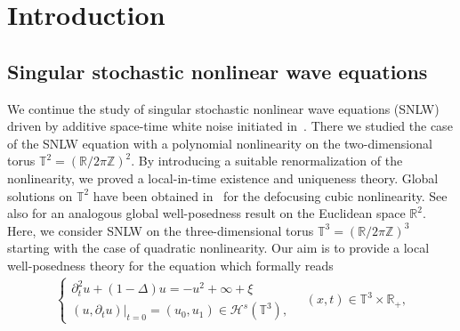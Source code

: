 \documentclass[%
11pt,  reqno]{amsart}
\newcommand{\1}{\hspace{0.2mm}\text{I}\hspace{0.2mm}}
\newcommand{\Z}{\mathbb{Z}}
\newcommand{\R}{\mathbb{R}}
\newcommand{\T}{\mathbb{T}}
\newcommand{\Dl}{\Delta}
\newcommand{\dt}{\partial_t}
\renewcommand{\H}{\mathcal{H}}
\numberwithin{equation}{section}
\numberwithin{theorem}{section}
\begin{document}
\begin{abstract}
Using  ideas from  paracontrolled calculus, 
we prove local well-posedness
of a renormalized version of the
 three-dimensional stochastic nonlinear wave equation 
with  quadratic nonlinearity forced by 
an additive space-time white noise on a periodic domain.
There are two new ingredients as compared to the parabolic setting.
(i) In constructing stochastic objects, 
we have to carefully exploit dispersion at a multilinear level.
(ii) We introduce novel random operators and leverage their regularity to overcome 
the lack of smoothing of usual paradifferential commutators. 


\end{abstract}



%
\maketitle
%
\tableofcontents




\newpage

\section{Introduction}
\label{SEC:1}



\subsection{Singular stochastic nonlinear wave equations}

We continue the study of singular stochastic  nonlinear wave equations (SNLW) driven by additive 
space-time white noise initiated in~\cite{GKO}. 
There we studied  the case of the SNLW equation with a polynomial nonlinearity on 
the two-dimensional torus $\T^2=(\R/2\pi \Z)^2$.
By  introducing a suitable renormalization of the nonlinearity, 
we proved a local-in-time existence and uniqueness theory. 
Global solutions on $\T^2$ have been obtained in~\cite{GKOT} for the defocusing cubic nonlinearity. 
See also \cite{Tolomeo}
for an analogous global well-posedness result on the Euclidean space $\R^2$.
Here,  we consider SNLW on the three-dimensional torus $\T^3=(\R/2\pi \Z)^3$ starting with the case of quadratic 
nonlinearity. Our aim is to provide a local well-posedness theory for the equation which formally reads
\begin{align}
\begin{cases}
\dt^2 u  + (1 -  \Dl)  u =  -u^2 +\infty + \xi\\
(u, \dt u) |_{t = 0} = (u_0, u_1) \in \H^s(\T^3), 
\end{cases}
\quad (x, t) \in \T^3\times \R_+,
\label{SNLW1}
\end{align}
\end{document}
